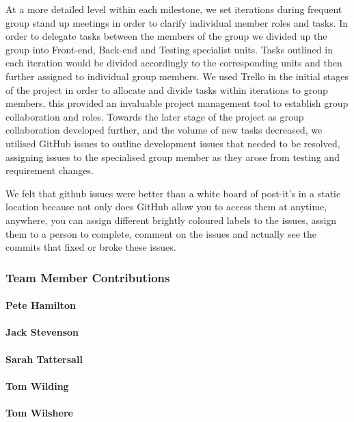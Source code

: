     At a more detailed level within each milestone, we set iterations during frequent group stand up meetings in order to clarify individual member roles and tasks. In order to delegate tasks between the members of the group we divided up the group into Front-end, Back-end and Testing specialist units. Tasks outlined in each iteration would be divided accordingly to the corresponding units and then further assigned to individual group members. We used Trello in the initial stages of the project in order to allocate and divide tasks within iterations to group members, this provided an invaluable project management tool to establish group collaboration and roles. Towards the later stage of the project as group collaboration developed further, and the volume of new tasks decreased, we utilised GitHub issues to outline development issues that needed to be resolved, assigning issues to the specialised group member as they arose from testing and requirement changes.

    We felt that github issues were better than a white board of post-it's in a static location because not only does GitHub allow you to access them at anytime, anywhere, you can assign different brightly coloured labels to the issues, assign them to a person to complete, comment on the issues and actually see the commits that fixed or broke these issues.

  \subsubsection {Team Member Contributions}
    \paragraph{Pete Hamilton}
    \paragraph{Jack Stevenson}
    \paragraph{Sarah Tattersall}
    \paragraph{Tom Wilding}
    \paragraph{Tom Wilshere}
